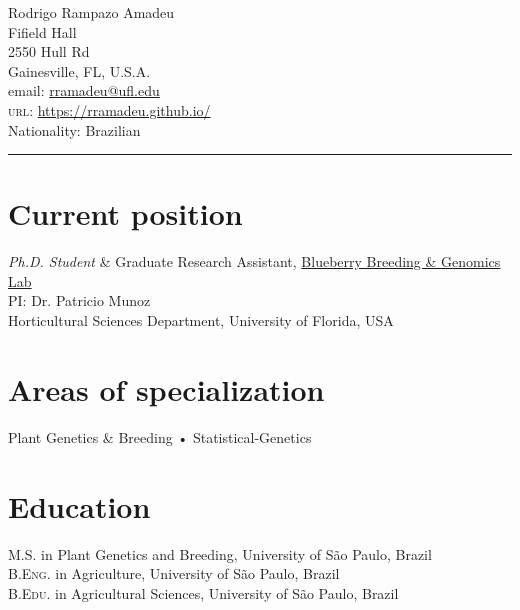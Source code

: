 \documentclass[10pt, a4paper]{article}
\newcommand{\years}[1]{\marginnote{\scriptsize #1}}
\begin{document}
{\LARGE Rodrigo Rampazo Amadeu}\\[1cm]
 Fifield Hall\\
 2550  Hull Rd\\
Gainesville, FL, U.S.A.\\[.2cm]
email: \href{mailto:rramadeu@ufl.edu}{rramadeu@ufl.edu}\\
\textsc{url}: \href{https://rramadeu.github.io/}{https://rramadeu.github.io/}\\ 
Nationality:  Brazilian\\
\hrule
\section*{Current position}
\emph{Ph.D. Student} \& Graduate Research Assistant, \href{https://www.blueberrybreeding.com}{Blueberry Breeding \& Genomics Lab}\\
PI: Dr. Patricio Munoz\\
Horticultural Sciences Department, University of Florida, USA

\section*{Areas of specialization}
 Plant Genetics \& Breeding • Statistical-Genetics


\section*{Education}
\noindent
\years{2018}\textsc{M.S.} in Plant Genetics and Breeding, University of São Paulo, Brazil\\
\years{2016}\textsc{B.Eng.} in Agriculture, University of São Paulo, Brazil\\
\years{2016}\textsc{B.Edu.} in Agricultural Sciences, University of São Paulo, Brazil\\
\end{document}

